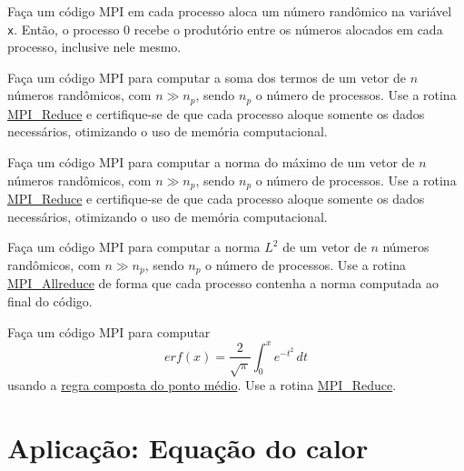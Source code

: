 \begin{exer}
  Faça um código MPI em cada processo aloca um número randômico na variável \verb+x+. Então, o processo 0 recebe o produtório entre os números alocados em cada processo, inclusive nele mesmo.
\end{exer}

\begin{exer}
  Faça um código MPI para computar a soma dos termos de um vetor de $n$ números randômicos, com $n\gg n_p$, sendo $n_p$ o número de processos. Use a rotina \href{https://www.open-mpi.org/doc/current/man3/MPI_Reduce.3.php}{MPI\_Reduce} e certifique-se de que cada processo aloque somente os dados necessários, otimizando o uso de memória computacional.
\end{exer}

\begin{exer}
  Faça um código MPI para computar a norma do máximo de um vetor de $n$ números randômicos, com $n\gg n_p$, sendo $n_p$ o número de processos. Use a rotina \href{https://www.open-mpi.org/doc/current/man3/MPI_Reduce.3.php}{MPI\_Reduce} e certifique-se de que cada processo aloque somente os dados necessários, otimizando o uso de memória computacional.
\end{exer}

\begin{exer}
  Faça um código MPI para computar a norma $L^2$ de um vetor de $n$ números randômicos, com $n\gg n_p$, sendo $n_p$ o número de processos. Use a rotina \href{https://www.open-mpi.org/doc/current/man3/MPI_Allreduce.3.php}{MPI\_Allreduce} de forma que cada processo contenha a norma computada ao final do código.
\end{exer}

\begin{exer}
  Faça um código MPI para computar
  \begin{equation}
    erf(x) = \frac{2}{\sqrt{\pi}}\int_0^x e^{-t^2}\,dt
  \end{equation}
  usando a \href{https://phkonzen.github.io/notas/MatematicaNumerica/cap_integr_sec_int_comp.html}{regra composta do ponto médio}. Use a rotina \href{https://www.open-mpi.org/doc/current/man3/MPI_Reduce.3.php}{MPI\_Reduce}.
\end{exer}

\section {Aplicação: Equação do calor}\label{cap_mpi_sec_calor}

